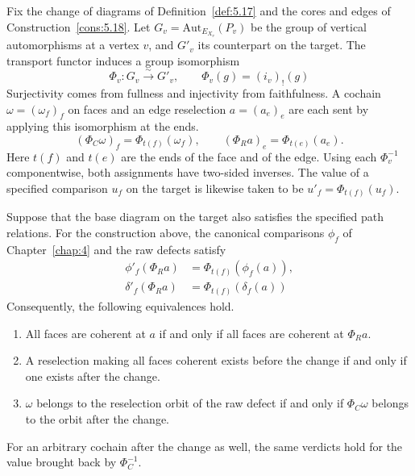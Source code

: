 \begin{construction}\label{cons:5.21}

Fix the change of diagrams of Definition~\ref{def:5.17} and the cores and edges of
Construction~\ref{cons:5.18}. Let $G_v=\mathrm{Aut}_{E_{X_v}}(P_v)$ be the group of vertical
automorphisms at a vertex $v$, and $G'_v$ its counterpart on the target. The transport
functor induces a group isomorphism
\begin{equation*}
\Phi_v:G_v\xrightarrow{\sim}G'_v,
\qquad \Phi_v(g)=(i_v)_!(g)
\tag{5.26}\label{eq:5.26}
\end{equation*}
Surjectivity comes from fullness and injectivity from faithfulness. A cochain
$\omega=(\omega_f)_f$ on faces and an edge reselection $a=(a_e)_e$ are each sent by applying
this isomorphism at the ends.
\begin{equation*}
(\Phi_C\omega)_f=\Phi_{t(f)}(\omega_f),
\qquad
(\Phi_R a)_e=\Phi_{t(e)}(a_e).
\tag{5.27}\label{eq:5.27}
\end{equation*}
Here $t(f)$ and $t(e)$ are the ends of the face and of the edge. Using each $\Phi_v^{-1}$
componentwise, both assignments have two-sided inverses. The value of a specified comparison
$u_f$ on the target is likewise taken to be $u'_f=\Phi_{t(f)}(u_f)$.

\end{construction}

\begin{theorem}\label{thm:5.22}

Suppose that the base diagram on the target also satisfies the specified path relations. For
the construction above, the canonical comparisons $\phi_f$ of Chapter~\ref{chap:4} and the
raw defects satisfy
\begin{equation*}
\begin{aligned}
\phi'_f(\Phi_Ra)&=\Phi_{t(f)}(\phi_f(a)),\\
\delta'_f(\Phi_Ra)&=\Phi_{t(f)}(\delta_f(a))
\end{aligned}
\tag{5.28}\label{eq:5.28}
\end{equation*}
Consequently, the following equivalences hold.

\begin{enumerate}
\item All faces are coherent at $a$ if and only if all faces are coherent at $\Phi_Ra$.
\item A reselection making all faces coherent exists before the change if and only if one
exists after the change.
\item $\omega$ belongs to the reselection orbit of the raw defect if and only if
$\Phi_C\omega$ belongs to the orbit after the change.
\end{enumerate}

For an arbitrary cochain after the change as well, the same verdicts hold for the value
brought back by $\Phi_C^{-1}$.

\end{theorem}

